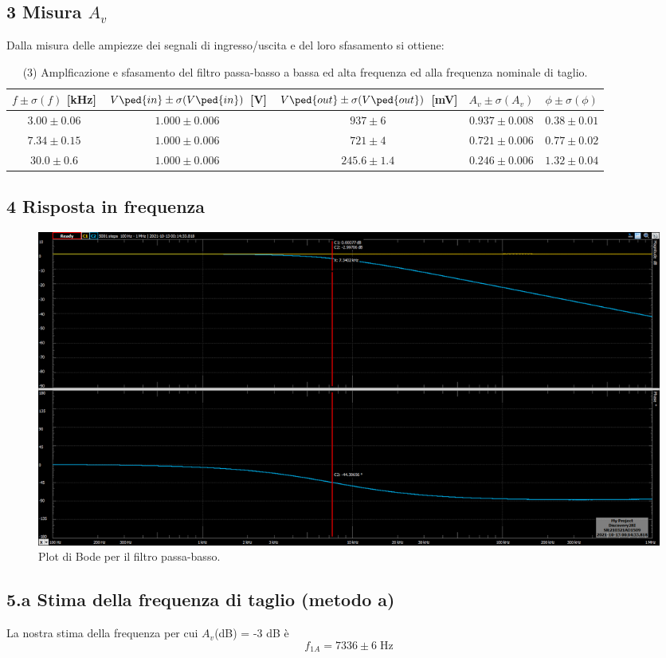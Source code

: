 \documentclass[10pt, a4paper, italian]{article}
\begin{document}
\subsection*{3 Misura $A_v$}
Dalla misura delle ampiezze dei segnali di ingresso/uscita e del loro 
sfasamento si ottiene:
\begin{table}[h]
\centering
\begin{tabular}{|c|c|c|c|c|}
\hline 
$f \pm \sigma(f)$ [kHz] & $V\ped{in} \pm \sigma(V\ped{in})$ [V] 
                        & $V\ped{out} \pm \sigma(V\ped{out})$ [mV] & $A_v \pm 
\sigma(A_v)$
& $\phi \pm \sigma(\phi)$ \\
\hline 
$3.00 \pm 0.06$ & $1.000 \pm 0.006$ & $937 \pm 6$ & $0.937 \pm 0.008$ & $0.38 \pm 
0.01$ \\
$7.34 \pm 0.15$ & $1.000 \pm 0.006$ & $721 \pm 4$ & $0.721 \pm 0.006$ & $0.77 \pm 
0.02$ \\
$30.0 \pm 0.6$ & $1.000 \pm 0.006$ & $245.6 \pm 1.4$ & $0.246 \pm 0.006$ & $1.32 \pm 
0.04$ \\
\hline 
\end{tabular} 
\caption{(3) Amplficazione e sfasamento del filtro passa-basso a bassa ed alta 
frequenza ed alla frequenza nominale di taglio.
\label{tab: lpfmes}}
\end{table}

\subsection*{4 Risposta in frequenza}
\begin{figure}[htbp]
\centering
\includegraphics[scale=0.35]{rc2k10nF_new}
\caption{Plot di Bode per il filtro passa-basso.}
\end{figure}

\subsection*{5.a Stima della frequenza di taglio (metodo a)}
La nostra stima della frequenza per cui $A_v$(dB) = -3 dB \`e
\[
f_{1A} = 7336 \pm 6 \; \si{\Hz}
\]
\end{document}
